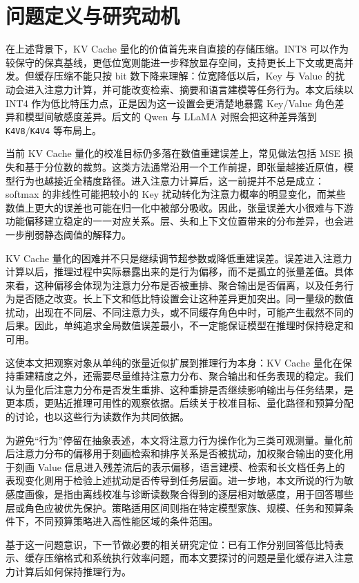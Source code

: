\section{问题定义与研究动机}

在上述背景下，KV Cache 量化的价值首先来自直接的存储压缩。INT8 可以作为较保守的保真基线，更低位宽则能进一步释放显存空间，支持更长上下文或更高并发。但缓存压缩不能只按 bit 数下降来理解：位宽降低以后，Key 与 Value 的扰动会进入注意力计算，并可能改变检索、摘要和语言建模等任务行为。本文后续以 INT4 作为低比特压力点，正是因为这一设置会更清楚地暴露 Key/Value 角色差异和模型间敏感度差异。后文的 Qwen 与 LLaMA 对照会把这种差异落到 \texttt{K4V8}/\texttt{K4V4} 等布局上。

当前 KV Cache 量化的校准目标仍多落在数值重建误差上，常见做法包括 MSE 损失和基于分位数的裁剪。这类方法通常沿用一个工作前提，即张量越接近原值，模型行为也越接近全精度路径。进入注意力计算后，这一前提并不总是成立：softmax 的非线性可能把较小的 Key 扰动转化为注意力概率的明显变化，而某些数值上更大的误差也可能在归一化中被部分吸收。因此，张量误差大小很难与下游功能偏移建立稳定的一一对应关系。层、头和上下文位置带来的分布差异，也会进一步削弱静态阈值的解释力。

KV Cache 量化的困难并不只是继续调节超参数或降低重建误差。误差进入注意力计算以后，推理过程中实际暴露出来的是行为偏移，而不是孤立的张量差值。具体来看，这种偏移会体现为注意力分布是否被重排、聚合输出是否偏离，以及任务行为是否随之改变。长上下文和低比特设置会让这种差异更加突出。同一量级的数值扰动，出现在不同层、不同注意力头，或不同缓存角色中时，可能产生截然不同的后果。因此，单纯追求全局数值误差最小，不一定能保证模型在推理时保持稳定和可用。

这使本文把观察对象从单纯的张量近似扩展到推理行为本身：KV Cache 量化在保持重建精度之外，还需要尽量维持注意力分布、聚合输出和任务表现的稳定。我们认为量化后注意力分布是否发生重排、这种重排是否继续影响输出与任务结果，是更本质，更贴近推理可用性的观察依据。后续关于校准目标、量化路径和预算分配的讨论，也以这些行为读数作为共同依据。

为避免“行为”停留在抽象表述，本文将注意力行为操作化为三类可观测量。量化前后注意力分布的偏移用于刻画检索和排序关系是否被扰动，加权聚合输出的变化用于刻画 Value 信息进入残差流后的表示偏移，语言建模、检索和长文档任务上的表现变化则用于检验上述扰动是否传导到任务层面。进一步地，本文所说的行为敏感度画像，是指由离线校准与诊断读数聚合得到的逐层相对敏感度，用于回答哪些层或角色应被优先保护。策略适用区间则指在特定模型家族、规模、任务和预算条件下，不同预算策略进入高性能区域的条件范围。

基于这一问题意识，下一节做必要的相关研究定位：已有工作分别回答低比特表示、缓存压缩格式和系统执行效率问题，而本文要探讨的问题是量化缓存进入注意力计算后如何保持推理行为。


